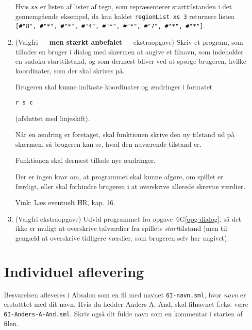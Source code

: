 \documentclass[a4paper]{article}
\begin{document}
\begin{enumerate}[{6}G1]
{%

Hvis \texttt{xs} er listen af lister af tegn, som repr{\ae}senterer starttilstanden i det gennemg{\aa}ende eksempel, da kan kaldet \texttt{regionList xs 3}
returnere listen \texttt{[\#"8", \#"*", \#"*", \#"4", \#"*", \#"*", \#"7", \#"*", \#"*"]}.}


\item{\label{opg-dialog}%
(Valgfri --- \textbf{men st{\ae}rkt anbefalet} --- ekstraopgave) Skriv et program, som tillader en bruger
i dialog med sk{\ae}rmen at angive et filnavn, som indeholder en sudoku-starttilstand, og som dern{\ae}st bliver ved at sp{\o}rge brugeren, hvilke koordinater, som der
skal skrives p{\aa}.

Brugeren skal kunne indtaste koordinater og {\ae}ndringer i formatet

\texttt{r s c}

(afsluttet med linjeskift).

N{\aa}r en {\ae}ndring er foretaget, skal funktionen skrive den ny tilstand
ud p{\aa} sk{\ae}rmen, s{\aa} brugeren kan se, hvad den nuv{\ae}rende tilstand er.

Funktionen skal dern{\ae}st tillade nye {\ae}ndringer.

Der er ingen krav om, at programmet skal kunne afg{\o}re, om spillet er f{\ae}rdigt, eller skal forhindre brugeren i at overskrive allerede skrevne v{\ae}rdier.

Vink: L{\ae}s eventuelt HR, kap. 16.}

\item{(Valgfri ekstraopgave) Udvid programmet fra opgave~6G\ref{opg-dialog},
s{\aa} det ikke er muligt at overskrive talv{\ae}rdier fra spillets \emph{start}tilstand
(men til geng{\ae}ld at overskrive tidligere v{\ae}rdier, som brugeren selv har angivet).}

\end{enumerate}



\section{Individuel aflevering}
Besvarelsen afleveres i Absalon som en fil med navnet
\texttt{6I-navn.sml}, hvor \emph{navn} er erstatttet med dit
navn. Hvis du hedder Anders A. And, skal filnavnet f.eks. v{\ae}re
\texttt{6I-Anders-A-And.sml}. Skriv ogs{\aa} dit fulde navn som en
kommentar i starten af filen.
\end{document}
